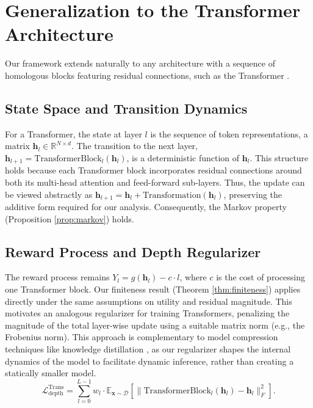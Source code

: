 \documentclass[12pt]{imsart}
\newcommand{\R}{\mathbb{R}}
\newcommand{\E}{\mathbb{E}}
\newcommand{\h}{\mathbf{h}}
\newcommand{\x}{\mathbf{x}}
\newcommand{\Ldepth}{\mathcal{L}_{\text{depth}}}
\theoremstyle{plain}
\theoremstyle{definition}
\begin{document}
\section{Generalization to the Transformer Architecture}
\label{sec:generalization}

Our framework extends naturally to any architecture with a sequence of homologous blocks featuring residual connections, such as the Transformer \cite{Vaswani2017}.

\subsection{State Space and Transition Dynamics}
For a Transformer, the state at layer $l$ is the sequence of token representations, a matrix $\h_l \in \R^{N \times d}$. The transition to the next layer, $\h_{l+1} = \text{TransformerBlock}_l(\h_l)$, is a deterministic function of $\h_l$. This structure holds because each Transformer block incorporates residual connections around both its multi-head attention and feed-forward sub-layers. Thus, the update can be viewed abstractly as $\h_{l+1} = \h_l + \text{Transformation}(\h_l)$, preserving the additive form required for our analysis. Consequently, the Markov property (Proposition \ref{prop:markov}) holds.

\subsection{Reward Process and Depth Regularizer}
The reward process remains $Y_l = g(\h_l) - c \cdot l$, where $c$ is the cost of processing one Transformer block. Our finiteness result (Theorem \ref{thm:finiteness}) applies directly under the same assumptions on utility and residual magnitude. This motivates an analogous regularizer for training Transformers, penalizing the magnitude of the total layer-wise update using a suitable matrix norm (e.g., the Frobenius norm). This approach is complementary to model compression techniques like knowledge distillation \cite{Sanh2019}, as our regularizer shapes the internal dynamics of the model to facilitate dynamic inference, rather than creating a statically smaller model.
\begin{equation} \label{eq:depth_loss_transformer}
\Ldepth^{\text{Trans}} = \sum_{l=0}^{L-1} w_l \cdot \E_{\x \sim \mathcal{D}} [\|\text{TransformerBlock}_l(\h_l) - \h_l\|_F^2].
\end{equation}

\end{document}
